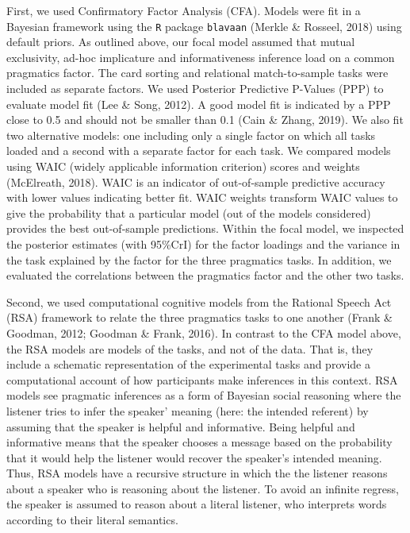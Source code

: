 \documentclass[
  english,
  man,floatsintext]{apa6}
\begin{document}
First, we used Confirmatory Factor Analysis (CFA). Models were fit in a Bayesian framework using the \texttt{R} package \texttt{blavaan} (Merkle \& Rosseel, 2018) using default priors. As outlined above, our focal model assumed that mutual exclusivity, ad-hoc implicature and informativeness inference load on a common pragmatics factor. The card sorting and relational match-to-sample tasks were included as separate factors. We used Posterior Predictive P-Values (PPP) to evaluate model fit (Lee \& Song, 2012). A good model fit is indicated by a PPP close to 0.5 and should not be smaller than 0.1 (Cain \& Zhang, 2019). We also fit two alternative models: one including only a single factor on which all tasks loaded and a second with a separate factor for each task. We compared models using WAIC (widely applicable information criterion) scores and weights (McElreath, 2018). WAIC is an indicator of out-of-sample predictive accuracy with lower values indicating better fit. WAIC weights transform WAIC values to give the probability that a particular model (out of the models considered) provides the best out-of-sample predictions. Within the focal model, we inspected the posterior estimates (with 95\%CrI) for the factor loadings and the variance in the task explained by the factor for the three pragmatics tasks. In addition, we evaluated the correlations between the pragmatics factor and the other two tasks.

Second, we used computational cognitive models from the Rational Speech Act (RSA) framework to relate the three pragmatics tasks to one another (Frank \& Goodman, 2012; Goodman \& Frank, 2016). In contrast to the CFA model above, the RSA models are models of the tasks, and not of the data. That is, they include a schematic representation of the experimental tasks and provide a computational account of how participants make inferences in this context. RSA models see pragmatic inferences as a form of Bayesian social reasoning where the listener tries to infer the speaker' meaning (here: the intended referent) by assuming that the speaker is helpful and informative. Being helpful and informative means that the speaker chooses a message based on the probability that it would help the listener would recover the speaker's intended meaning. Thus, RSA models have a recursive structure in which the the listener reasons about a speaker who is reasoning about the listener. To avoid an infinite regress, the speaker is assumed to reason about a literal listener, who interprets words according to their literal semantics.
\end{document}
